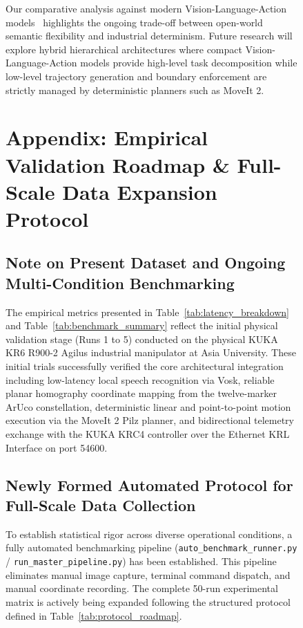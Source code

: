 \documentclass[runningheads]{llncs}
\begin{document}
\begin{figure}[tb]
Our comparative analysis against modern Vision-Language-Action models~\cite{rt2_2023,openvla2024,octo2024} highlights the ongoing trade-off between open-world semantic flexibility and industrial determinism. Future research will explore hybrid hierarchical architectures where compact Vision-Language-Action models provide high-level task decomposition while low-level trajectory generation and boundary enforcement are strictly managed by deterministic planners such as MoveIt 2.




\newpage
\section*{Appendix: Empirical Validation Roadmap \& Full-Scale Data Expansion Protocol}

\subsection*{Note on Present Dataset and Ongoing Multi-Condition Benchmarking}
The empirical metrics presented in Table~\ref{tab:latency_breakdown} and Table~\ref{tab:benchmark_summary} reflect the initial physical validation stage (Runs 1 to 5) conducted on the physical KUKA KR6 R900-2 Agilus industrial manipulator at Asia University. These initial trials successfully verified the core architectural integration including low-latency local speech recognition via Vosk, reliable planar homography coordinate mapping from the twelve-marker ArUco constellation, deterministic linear and point-to-point motion execution via the MoveIt 2 Pilz planner, and bidirectional telemetry exchange with the KUKA KRC4 controller over the Ethernet KRL Interface on port 54600.

\subsection*{Newly Formed Automated Protocol for Full-Scale Data Collection}
To establish statistical rigor across diverse operational conditions, a fully automated benchmarking pipeline (\texttt{auto\_benchmark\_runner.py} / \texttt{run\_master_pipeline.py}) has been established. This pipeline eliminates manual image capture, terminal command dispatch, and manual coordinate recording. The complete 50-run experimental matrix is actively being expanded following the structured protocol defined in Table~\ref{tab:protocol_roadmap}.


\end{figure}
\end{document}
